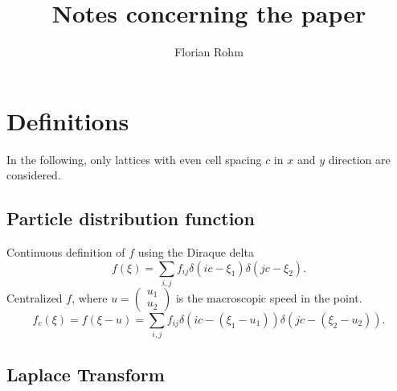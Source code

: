 \documentclass{article}
\title{Notes concerning the paper}
\author{Florian Rohm}
\begin{document}
\maketitle
\tableofcontents
\newpage

\section{Definitions}
\label{sec:Definitions}
In the following, only lattices with even cell spacing $c$ in $x$ and $y$ direction are considered.

\subsection{Particle distribution function}
\label{sub:Particle distribution function}

Continuous definition of $f$ using the Diraque delta
\begin{equation}
  \label{eq:Definition of f xi}
  f(\xi) = \sum_{i,j} f_{ij}\delta(ic - \xi_1)\delta(jc - \xi_2).
\end{equation}
Centralized $f$, where $u=\begin{pmatrix}u_1 \\ u_2\end{pmatrix}$ is the macroscopic speed in the point.
\begin{equation}
  \label{eq:Definition of f_c xi}
  f_c(\xi) = f(\xi-u) = \sum_{i,j} f_{ij}\delta(ic - (\xi_1-u_1))\delta(jc - (\xi_2-u_2)).
\end{equation}

\subsection{Laplace Transform}
\label{sub:Laplace Transform}
\end{document}
